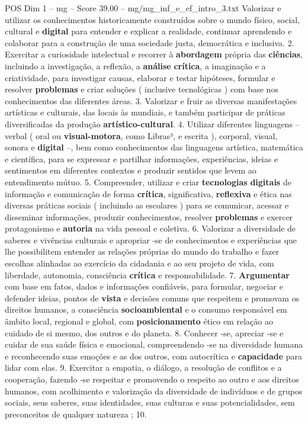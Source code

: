 \begin{textsample}{POS Dim 1 – mg – Score 39.00 – mg/mg\_inf\_e\_ef\_intro\_3.txt}
Valorizar e utilizar os conhecimentos historicamente construídos sobre o mundo físico, social, cultural e \textbf{digital} para entender e explicar a realidade, continuar aprendendo e colaborar para a construção de uma sociedade justa, democrática e inclusiva. 2.
Exercitar a curiosidade intelectual e recorrer à \textbf{abordagem} própria das \textbf{ciências}, incluindo a investigação, a reflexão, a \textbf{análise} \textbf{crítica}, a imaginação e a criatividade, para investigar causas, elaborar e testar hipóteses, formular e resolver \textbf{problemas} e criar soluções ( inclusive tecnológicas ) com base nos conhecimentos das diferentes áreas. 3.
Valorizar e fruir as diversas manifestações artísticas e culturais, das locais às mundiais, e também participar de práticas diversificadas da produção \textbf{artístico-cultural}. 4.
Utilizar diferentes linguagens – verbal ( oral ou \textbf{visual-motora}, como Libras³, e escrita ), corporal, visual, sonora e \textbf{digital} –, bem como conhecimentos das linguagens artística, matemática e científica, para se expressar e partilhar informações, experiências, ideias e sentimentos em diferentes contextos e produzir sentidos que levem ao entendimento mútuo. 5.
Compreender, utilizar e criar \textbf{tecnologias} \textbf{digitais} de informação e comunicação de forma \textbf{crítica}, significativa, \textbf{reflexiva} e ética nas diversas práticas sociais ( incluindo as escolares ) para se comunicar, acessar e disseminar informações, produzir conhecimentos, resolver \textbf{problemas} e exercer protagonismo e \textbf{autoria} na vida pessoal e coletiva. 6.
Valorizar a diversidade de saberes e vivências culturais e apropriar -se de conhecimentos e experiências que lhe possibilitem entender as relações próprias do mundo do trabalho e fazer escolhas alinhadas ao exercício da cidadania e ao seu projeto de vida, com liberdade, autonomia, consciência \textbf{crítica} e responsabilidade. 7. \textbf{Argumentar} com base em fatos, dados e informações confiáveis, para formular, negociar e defender ideias, pontos de \textbf{vista} e decisões comuns que respeitem e promovam os direitos humanos, a consciência \textbf{socioambiental} e o consumo responsável em âmbito local, regional e global, com \textbf{posicionamento} ético em relação ao cuidado de si mesmo, dos outros e do planeta. 8.
Conhecer -se, apreciar -se e cuidar de sua saúde física e emocional, compreendendo -se na diversidade humana e reconhecendo suas emoções e as dos outros, com autocrítica e \textbf{capacidade} para lidar com elas. 9.
Exercitar a empatia, o diálogo, a resolução de conflitos e a cooperação, fazendo -se respeitar e promovendo o respeito ao outro e aos direitos humanos, com acolhimento e valorização da diversidade de indivíduos e de grupos sociais, seus saberes, suas identidades, suas culturas e suas potencialidades, sem preconceitos de qualquer natureza ; 10.

\end{textsample}
